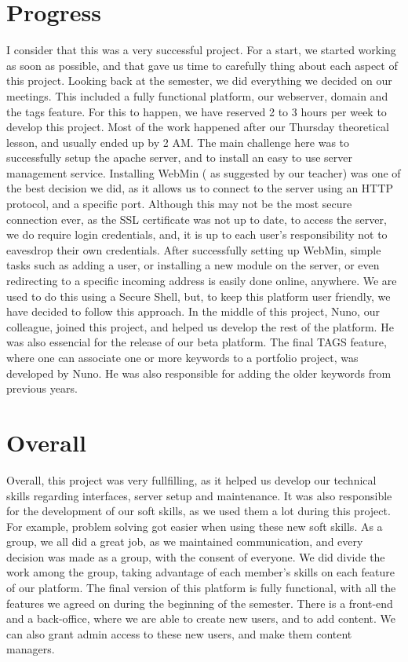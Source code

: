 \documentclass[a4paper,12pt,journal,twoside,compsoc]{PPIEEEtran}
\begin{document}
\section{Progress}
I consider that this was a very successful project. For a start, we started working as soon as possible, and that gave us time to carefully thing about each aspect of this project. Looking back at the semester, we did everything we decided on our meetings. This included a fully functional platform, our webserver, domain and the tags feature.
	For this to happen, we have reserved 2 to 3 hours per week to develop this project. Most of the work happened after our Thursday theoretical lesson, and usually ended up by 2 AM.
	The main challenge here was to successfully setup the apache server, and to install an easy to use server management service. Installing WebMin ( as suggested by our teacher) was one of the best decision we did, as it allows us to connect to the server using an HTTP protocol, and a specific port. Although this may not be the most secure connection ever, as the SSL certificate was not up to date, to access the server, we do require login credentials, and, it is up to each user's responsibility not to eavesdrop their own credentials.
	After successfully setting up WebMin, simple tasks such as adding a user, or installing a new module on the server, or even redirecting to a specific incoming address is easily done online, anywhere. We are used to do this using a Secure Shell, but, to keep this platform user friendly, we have decided to follow this approach.
	In the middle of this project, Nuno, our colleague, joined this project, and helped us develop the rest of the platform. He was also essencial for the release of our beta platform. The final TAGS feature, where one can associate one or more keywords to a portfolio project, was developed by Nuno. He was also responsible for adding the older keywords from previous years.
	
	
\section{Overall}
Overall, this project was very fullfilling, as it helped us develop our technical skills regarding interfaces, server setup and maintenance. It was also responsible for the development of our soft skills, as we used them a lot during this project. For example, problem solving got easier when using these new soft skills.
As a group, we all did a great job, as we maintained communication, and every decision was made as a group, with the consent of everyone.
We did divide the work among the group, taking advantage of each member's skills on each feature of our platform.
The final version of this platform is fully functional, with all the features we agreed on during the beginning of the semester. There is a front-end and a back-office, where we are able to create new users, and to add content. We can also grant admin access to these new users, and make them content managers.
\end{document}

